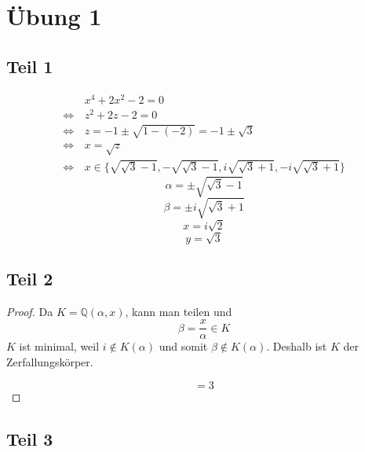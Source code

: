 \documentclass[10pt,a4paper]{article}
\begin{document}
\section{Übung 1}

\subsection{Teil 1}

\begin{align*}
  & x^{4} + 2x^{2} - 2 = 0\\
  \Leftrightarrow \, & z^{2} + 2z - 2 = 0\\
  \Leftrightarrow \, & z = -1 \pm \sqrt{1 - (-2)} = -1 \pm \sqrt{3}\\
  \Leftrightarrow \, & x = \sqrt{z}\\
  \Leftrightarrow \, & x \in \{ \sqrt{\sqrt{3} - 1}, -\sqrt{\sqrt{3} - 1}, i\sqrt{\sqrt{3} + 1}, -i\sqrt{\sqrt{3} + 1} \}
\end{align*}
\begin{equation}
  \alpha = \pm\sqrt{\sqrt{3} - 1}
\end{equation}
\begin{equation}
  \beta = \pm i\sqrt{\sqrt{3} + 1}
\end{equation}
\begin{equation}
  x = i\sqrt{2}
\end{equation}
\begin{equation}
  y = \sqrt{3}
\end{equation}

\subsection{Teil 2}

\begin{proof}
  Da $K = \mathbb{Q}(\alpha, x)$, kann man teilen und
  \begin{equation}
    \beta = \frac{x}{\alpha} \in K
  \end{equation}
  $K$ ist minimal, weil $i \not\in K(\alpha)$ und somit $\beta \not\in K(\alpha)$.
  Deshalb ist $K$ der Zerfallungskörper.

  \begin{equation}
    [K : \mathbb{Q}] = 3
  \end{equation}
\end{proof}

\subsection{Teil 3}
\end{document}
